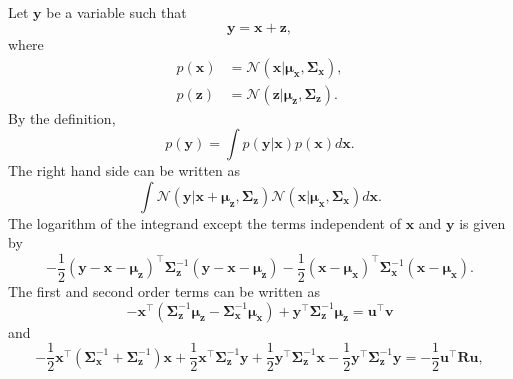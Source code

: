 \subsection{}
\label{2.31}
Let $\mathbf{y}$ be a variable such that 
%
\begin{equation}
\mathbf{y}
= 
\mathbf{x} 
+ 
\mathbf{z},
\end{equation}
%
where
%
\begin{equation}
\begin{aligned}
p(\mathbf{x}) 
&= 
\mathcal{N} 
\left( 
	\mathbf{x} 
	| 
	\bm{\mu}_{\mathbf{x}}, 
	\bm{\Sigma}_{\mathbf{x}} 
\right), 
\\
p(\mathbf{z}) 
&= 
\mathcal{N} 
\left( 
	\mathbf{z} 
	| 
	\bm{\mu}_{\mathbf{z}}, 
	\bm{\Sigma}_{\mathbf{z}} 
\right).
\end{aligned}
\end{equation}
%
By the definition,
%
\begin{equation}
p(\mathbf{y})
= 
\int 
p(\mathbf{y} | \mathbf{x}) 
p(\mathbf{x}) 
d\mathbf{x}.
\end{equation}
%
The right hand side can be written as
%
\begin{equation}
\int 
\mathcal{N} 
\left( 
	\mathbf{y} 
	| 
	\mathbf{x} 
	+ 
	\bm{\mu}_{\mathbf{z}}, 
	\bm{\Sigma}_{\mathbf{z}} 
\right) 
\mathcal{N} 
\left( 
	\mathbf{x} 
	| 
	\bm{\mu}_{\mathbf{x}}, 
	\bm{\Sigma}_{\mathbf{x}} 
\right) 
	d\mathbf{x}.
\end{equation}
%
The logarithm of the integrand except the terms independent of $\mathbf{x}$ and $\mathbf{y}$ is given by
%
\begin{equation}
- \frac{1}{2} 
\left( 
	\mathbf{y}
	 - 
	 \mathbf{x} 
	 - 
	 \bm{\mu}_{\mathbf{z}} 
\right) ^ \intercal 
	\bm{\Sigma}_{\mathbf{z}} ^ {- 1} 
	\left( 
		\mathbf{y} 
		- 
		\mathbf{x} 
		- 
		\bm{\mu}_{\mathbf{z}} 
\right) 
- 
\frac{1}{2} 
(\mathbf{x} - \bm{\mu}_{\mathbf{x}}) ^ \intercal 
\bm{\Sigma}_{\mathbf{x}} ^ {- 1} 
(\mathbf{x} - \bm{\mu}_{\mathbf{x}}).
\end{equation}
%
The first and second order terms can be written as
%
\begin{equation}
-
\mathbf{x} ^ \intercal
\left( 
	\bm{\Sigma}_{\mathbf{z}} ^ {- 1}
	\bm{\mu}_{\mathbf{z}}
	-
	\bm{\Sigma}_{\mathbf{x}} ^ {- 1}
	\bm{\mu}_{\mathbf{x}}
\right)
+
\mathbf{y} ^ \intercal
\bm{\Sigma}_{\mathbf{z}} ^ {- 1}
\bm{\mu}_{\mathbf{z}}
=
\mathbf{u} ^ \intercal
\mathbf{v}
\end{equation}
%
and 
%
\begin{equation}
- 
\frac{1}{2}
\mathbf{x} ^ \intercal
\left( 
	\bm{\Sigma}_{\mathbf{x}} ^ {- 1}
	+ \bm{\Sigma}_{\mathbf{z}} ^ {- 1}
\right)
\mathbf{x} 
+ 
\frac{1}{2} 
\mathbf{x} ^ \intercal 
\bm{\Sigma}_{\mathbf{z}} ^ {- 1}
\mathbf{y}
+ 
\frac{1}{2} 
\mathbf{y} ^ \intercal 
\bm{\Sigma}_{\mathbf{z}} ^ {- 1}
\mathbf{x}
- 
\frac{1}{2} 
\mathbf{y} ^ \intercal 
\bm{\Sigma}_{\mathbf{z}} ^ {- 1} 
\mathbf{y}
=
-\frac{1}{2}
\mathbf{u} ^ \intercal
\mathbf{R}
\mathbf{u},
\end{equation}
